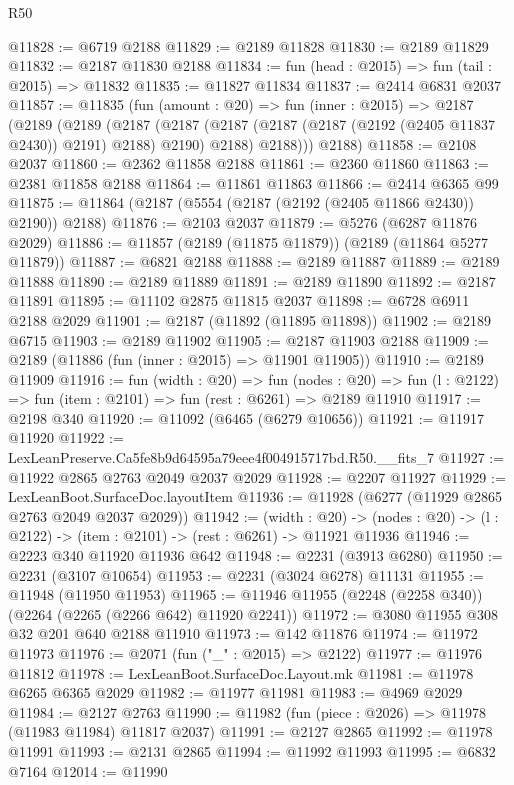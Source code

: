 \begin{lexlean}{R50}
\begin{coremodule}
@11828 := @6719 @2188
@11829 := @2189 @11828
@11830 := @2189 @11829
@11832 := @2187 @11830 @2188
@11834 := fun (head : @2015) => fun (tail : @2015) => @11832
@11835 := @11827 @11834
@11837 := @2414 @6831 @2037
@11857 := @11835
    (fun (amount : @20) =>
    fun (inner : @2015) =>
    @2187
      (@2189
        (@2189
          (@2187
            (@2187 (@2187 (@2187 (@2187 (@2192 (@2405 @11837 @2430)) @2191) @2188) @2190) @2188)
            @2188)))
      @2188)
@11858 := @2108 @2037
@11860 := @2362 @11858 @2188
@11861 := @2360 @11860
@11863 := @2381 @11858 @2188
@11864 := @11861 @11863
@11866 := @2414 @6365 @99
@11875 := @11864 (@2187 (@5554 (@2187 (@2192 (@2405 @11866 @2430)) @2190)) @2188)
@11876 := @2103 @2037
@11879 := @5276 (@6287 @11876 @2029)
@11886 := @11857 (@2189 (@11875 @11879)) (@2189 (@11864 @5277 @11879))
@11887 := @6821 @2188
@11888 := @2189 @11887
@11889 := @2189 @11888
@11890 := @2189 @11889
@11891 := @2189 @11890
@11892 := @2187 @11891
@11895 := @11102 @2875 @11815 @2037
@11898 := @6728 @6911 @2188 @2029
@11901 := @2187 (@11892 (@11895 @11898))
@11902 := @2189 @6715
@11903 := @2189 @11902
@11905 := @2187 @11903 @2188
@11909 := @2189 (@11886 (fun (inner : @2015) => @11901 @11905))
@11910 := @2189 @11909
@11916 := fun (width : @20) =>
  fun (nodes : @20) => fun (l : @2122) => fun (item : @2101) => fun (rest : @6261) => @2189 @11910
@11917 := @2198 @340
@11920 := @11092 (@6465 (@6279 @10656))
@11921 := @11917 @11920
@11922 := LexLeanPreserve.Ca5fe8b9d64595a79eee4f004915717bd.R50.__fits_7
@11927 := @11922 @2865 @2763 @2049 @2037 @2029
@11928 := @2207 @11927
@11929 := LexLeanBoot.SurfaceDoc.layoutItem
@11936 := @11928 (@6277 (@11929 @2865 @2763 @2049 @2037 @2029))
@11942 := (width : @20) ->
  (nodes : @20) -> (l : @2122) -> (item : @2101) -> (rest : @6261) -> @11921 @11936
@11946 := @2223 @340 @11920 @11936 @642
@11948 := @2231 (@3913 @6280)
@11950 := @2231 (@3107 @10654)
@11953 := @2231 (@3024 @6278) @11131
@11955 := @11948 (@11950 @11953)
@11965 := @11946 @11955 (@2248 (@2258 @340)) (@2264 (@2265 (@2266 @642) @11920 @2241))
@11972 := @3080 @11955 @308 @32 @201 @640 @2188 @11910
@11973 := @142 @11876
@11974 := @11972 @11973
@11976 := @2071 (fun ("_" : @2015) => @2122)
@11977 := @11976 @11812
@11978 := LexLeanBoot.SurfaceDoc.Layout.mk
@11981 := @11978 @6265 @6365 @2029
@11982 := @11977 @11981
@11983 := @4969 @2029
@11984 := @2127 @2763
@11990 := @11982 (fun (piece : @2026) => @11978 (@11983 @11984) @11817 @2037)
@11991 := @2127 @2865
@11992 := @11978 @11991
@11993 := @2131 @2865
@11994 := @11992 @11993
@11995 := @6832 @7164
@12014 := @11990

\end{coremodule}
\end{lexlean}
